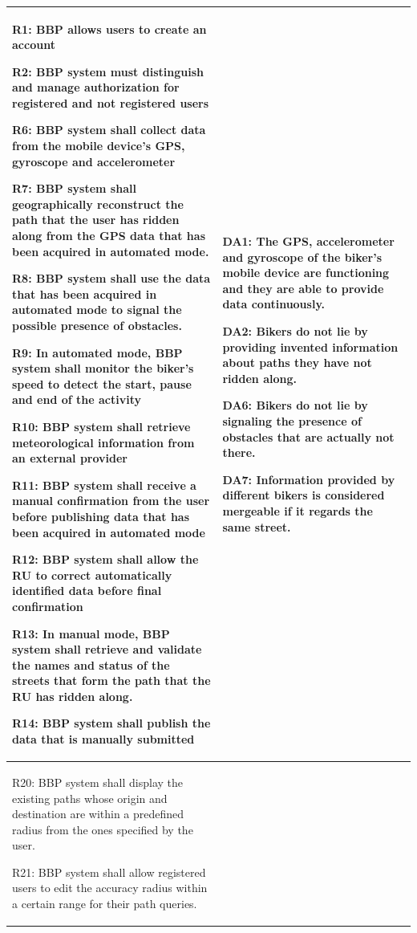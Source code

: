 \documentclass{article}
\begin{document}
\begin{longtable}{|p{}|p{}|}
    R1: BBP allows users to create an account \par
    R2: BBP system must distinguish and manage authorization for registered and not registered users \par
    R6: BBP system shall collect data from the mobile device’s GPS, gyroscope and accelerometer \par
    R7: BBP system shall geographically reconstruct the path that the user has ridden along from the GPS data that has been acquired in automated mode. \par
    R8: BBP system shall use the data that has been acquired in automated mode to signal the possible presence of obstacles. \par
    R9: In automated mode, BBP system shall monitor the biker’s speed to detect the start, pause and end of the activity \par
    R10: BBP system shall retrieve meteorological information from an external provider \par
    R11: BBP system shall receive a manual confirmation from the user before publishing data that has been acquired in automated mode \par
    R12: BBP system shall allow the RU to correct automatically identified data before final confirmation \par
    R13: In manual mode, BBP system shall retrieve and validate the names and status of the streets that form the path that the RU has ridden along. \par
    R14: BBP system shall publish the data that is manually submitted 
    & 
    DA1: The GPS, accelerometer and gyroscope of the biker’s mobile device are functioning and they are able to provide data continuously. \par
    DA2: Bikers do not lie by providing invented information about paths they have not ridden along. \par
    DA6: Bikers do not lie by signaling the presence of obstacles that are actually not there. \par
    DA7: Information provided by different bikers is considered mergeable if it regards the same street.
    \\
    \hline
    R20: BBP system shall display the existing paths whose origin and destination are within a predefined radius from the ones specified by the user. \par
    R21: BBP system shall allow registered users to edit the accuracy radius within a certain range for their path queries.  \par

\end{longtable}
\end{document}
